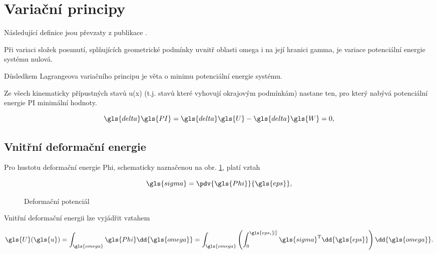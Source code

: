 \section{Variační principy}

Následující definice jsou převzaty z publikace \cite[kap. 6.2]{ymkp}.

\begin{definition}
    Při variaci složek posunutí, splňujících geometrické podmínky uvnitř oblasti \gls{omega} i na její hranici \gls{gamma}, je variace potenciální energie systému nulová.
\end{definition}

Důsledkem Lagrangeova variačního principu je věta o minimu potenciální energie systému.

\begin{definition}
    Ze všech kinematicky přípustných stavů \gls{u}(\gls{x}) (t.j. stavů které vyhovují okrajovým podmínkám) nastane ten, pro který nabývá potenciální energie \gls{PI} minimální hodnoty.
\end{definition}

\begin{equation}
    \gls{delta}\gls{PI} = \gls{delta}\gls{U} - \gls{delta}\gls{W} = 0,
\end{equation}


\subsection{Vnitřní deformační energie}
Pro hustotu deformační energie \gls{Phi}, schematicky naznačenou na obr. \ref{fig:stress_strain}, platí vztah

\begin{equation}
    \gls{sigma} = \pdv{\gls{Phi}}{\gls{eps}},
\end{equation}

\begin{figure}[H]
    
    \caption{Deformační potenciál}
    \label{fig:stress_strain}
\end{figure}

Vnitřní deformační energii lze vyjádřit vztahem

\begin{equation}
    \gls{U}(\gls{u}) = \int_{\gls{omega}} \gls{Phi} \dd{\gls{omega}} = \int_{\gls{omega}} \left( \int_{0}^{\gls{eps_i}[ ]} \gls{sigma}^\mathrm{T} \dd{\gls{eps}}   \right) \dd{\gls{omega}}.
\end{equation}

